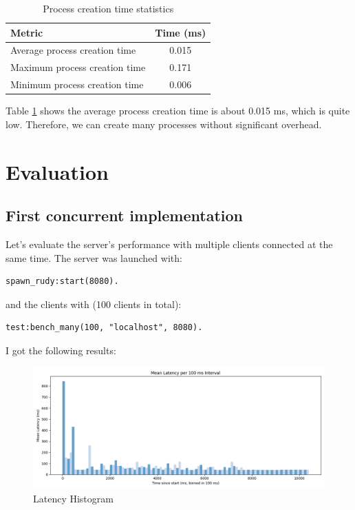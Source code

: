 \documentclass[a4paper, 11pt]{article}
\begin{document}
\begin{table}[H]
\centering
\begin{tabular}{|l|c|}
\hline
\textbf{Metric} & \textbf{Time (ms)} \\
\hline
Average process creation time & 0.015 \\
Maximum process creation time & 0.171 \\
Minimum process creation time & 0.006 \\
\hline
\end{tabular}
\caption{Process creation time statistics}
\label{tab:process_creation_time}
\end{table}
\FloatBarrier

Table \ref{tab:process_creation_time} shows the average process creation time is about 0.015 ms, which is quite low. Therefore, we can create many processes without significant overhead.

\section{Evaluation}
\subsection{First concurrent implementation}

Let's evaluate the server's performance with multiple clients connected at the same time.
The server was launched with:
\begin{verbatim}
spawn_rudy:start(8080).  
\end{verbatim}
and the clients with (100 clients in total):
\begin{verbatim}
test:bench_many(100, "localhost", 8080).
\end{verbatim}

I got the following results:
\begin{figure}[H]
  \centering
  \includegraphics[width=0.9\linewidth]{many_benches/latency_histogram.png}
  \caption{Latency Histogram}
  \label{fig:latency_histogram}
\end{figure}
\FloatBarrier
\end{document}
